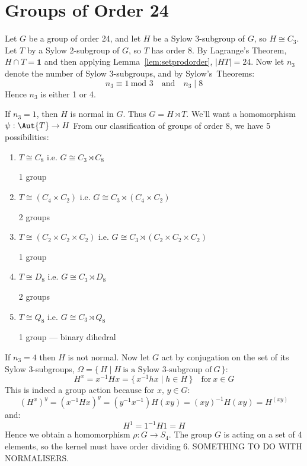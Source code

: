 \section{Groups of Order 24}
Let \(G\) be a group of order 24, and let \(H\) be a Sylow 3-subgroup of \(G\), so \(H \cong C_3\).
Let \(T\) by a Sylow 2-subgroup of \(G\), so \(T\) has order 8.
By Lagrange's Theorem, \(H \cap T = \bm{1}\) and then applying Lemma~\ref{lem:setprodorder}, \(|HT| = 24\).
Now let \(n_3\) denote the number of Sylow 3-subgroups, and by Sylow's~Theorems:
\[n_3 \equiv 1\ \text{mod 3} \quad \text{and} \quad n_3 \mid 8\]
Hence \(n_3\) is either 1 or 4.

If \(n_3 = 1\), then \(H\) is normal in \(G\).
Thus \(G = H \rtimes T\).
We'll want a homomorphism \(\psi: \Aut{T} \to H\)
From our classification of groups of order 8, we have 5 possibilities:

\begin{enumerate}
    \item \(T \cong C_8\) i.e. \(G \cong C_3 \rtimes C_8\)
        
        1 group
    \item \(T \cong (C_4 \times C_2)\) i.e. \(G \cong C_3 \rtimes (C_4 \times C_2)\)
    
        2 groups
    \item \(T \cong (C_2 \times C_2 \times C_2)\) i.e. \(G \cong C_3 \rtimes (C_2 \times C_2 \times C_2)\)

        1 group
    \item \(T \cong D_8\) i.e. \(G \cong C_3 \rtimes D_8\)
        
        2 groups
    \item \(T \cong Q_8\) i.e. \(G \cong C_3 \rtimes Q_8\)

        1 group --- binary dihedral
\end{enumerate}

If \(n_3 = 4\) then \(H\) is not normal.
Now let \(G\) act by conjugation on the set of its Sylow 3-subgroups, \(\Omega = \{\,H \mid H\ \text{is a Sylow
3-subgroup of}\ G\,\}\):
\[H^x = x^{-1}Hx = \{\,x^{-1}hx \mid h \in H\,\} \quad \text{for}\ x \in G\]
This is indeed a group action because for \(x,\,y \in G\):
\[{(H^x)}^y = {(x^{-1}Hx)}^y = (y^{-1}x^{-1})H(xy) = {(xy)}^{-1}H(xy) = H^{(xy)}\]
and:
\[H^1 = 1^{-1}H1 = H\]
Hence we obtain a homomorphism \(\rho:G \to S_4\).
The group \(G\) is acting on a set of 4 elements, so the kernel must have order dividing 6.
SOMETHING TO DO WITH NORMALISERS\@.

